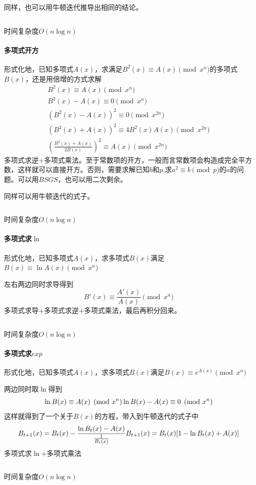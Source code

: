 \documentclass[UTF-8]{ctexart}
\newcommand{\cpp}[1]{\inputminted[bgcolor=bg,breaklines,breakanywhere=true]{c++}{#1}}
\begin{document}
			同样，也可以用牛顿迭代推导出相同的结论。
			\cpp{code//Math//polyinv.cpp}
			时间复杂度$O(n\log n)$
			\paragraph{多项式开方} 形式化地，已知多项式$A(x)$，求满足$B^2(x) \equiv A(x) \pmod{x^n}$的多项式$B(x)$，还是用倍增的方式求解
			\begin{align}
			B^2(x) \equiv A(x) \pmod{x^n} \nonumber\\ B^2(x)-A(x) \equiv 0 \pmod {x^n} \nonumber\\ (B^2(x)-A(x))^2 \equiv 0 \pmod{x^{2n}} \nonumber\\ (B^2(x)+A(x))^2 \equiv 4B^2(x)A(x) \pmod{x^{2n}} \nonumber\\ ( \frac{B^2(x)+A(x)}{2B(x)} ) ^2 \equiv A(x) \pmod{x^{2n}}\nonumber
			\end{align}
			多项式求逆+多项式乘法。至于常数项的开方，一般而言常数项会构造成完全平方数，这样就可以直接开方。否则，需要求解已知$b$和$p$,求$a^2 \equiv b \pmod{p}$的$a$的问题。可以用$BSGS$，也可以用二次剩余。
			
			同样可以用牛顿迭代的式子。
			\cpp{code//Math//polysqrt.cpp}
			时间复杂度$O(n\log n)$
			\paragraph{多项式求$\ln$} 形式化地，已知多项式$A(x)$，求多项式$B(x)$满足$B(x) \equiv \ln{A(x)} \pmod{x^n}$  
			
			左右两边同时求导得到
			$$B'(x) \equiv \frac{A'(x)}{A(x)} \pmod{x^n}$$
			多项式求导+多项式求逆+多项式乘法，最后再积分回来。
			\cpp{code//Math//polyln.cpp}
			时间复杂度$O(n\log n)$
			\paragraph{多项式求$exp$}形式化地，已知多项式$A(x)$，求多项式$B(x)$满足$B(x) \equiv e^{A(x)} \pmod{x^n}$  
			
			两边同时取$\ln$得到
			$$\ln{B(x)} \equiv A(x) \pmod{x^n} \\\\ \ln{B(x)}-A(x) \equiv 0 \pmod{x^n}$$
			这样就得到了一个关于$B(x)$的方程，带入到牛顿迭代的式子中
			$$B _ {t+1}(x)=B _ t(x)-\frac{\ln{B _ t(x)}-A(x)}{\frac{1}{B _ t(x)}} \\\\ B _ {t+1}(x)=B _ t(x)[1-\ln{B _ t(x)}+A(x)]$$
			多项式求$\ln$+多项式乘法
			\cpp{code//Math//polyexp.cpp}
			时间复杂度$O(n\log n)$
\end{document}
